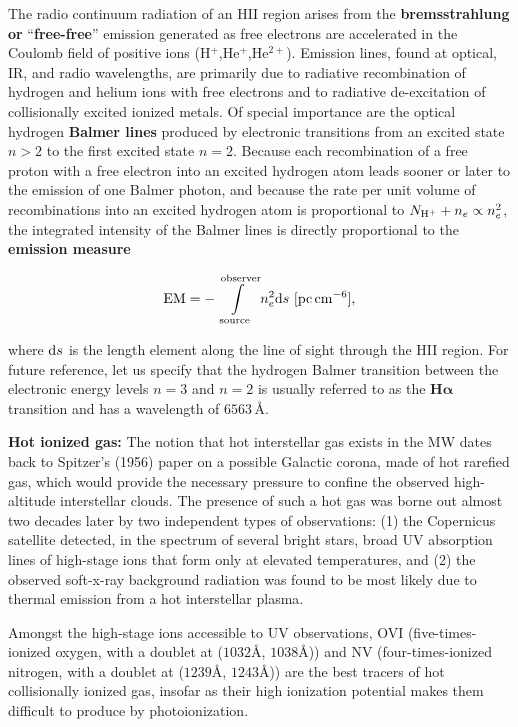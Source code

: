 \documentclass[a4paper,10pt]{article}
\begin{document}
{\noindent}The radio continuum radiation of an HII region arises
from the \textbf{bremsstrahlung or} ``\textbf{free-free}'' emission generated as free electrons are accelerated in the Coulomb field of positive ions (H$^+$,He$^+$,He$^{2+}$). Emission lines, found at optical, IR, and radio wavelengths, are primarily due to radiative recombination of hydrogen and helium ions with free electrons and to radiative de-excitation of collisionally excited ionized metals. Of special importance are the optical hydrogen \textbf{Balmer lines} produced by electronic transitions from an excited state $n>2$ to the first excited state $n=2$. Because each recombination of a free proton with a free electron into an excited hydrogen atom leads sooner or later to the emission of one Balmer photon, and because the rate per unit volume of recombinations into an excited hydrogen atom is proportional to $N_{\rm H^+} + n_e \propto n_e^2$, the integrated intensity of the Balmer lines is directly proportional to the \textbf{emission measure}

\begin{align*}
    {\rm EM} = -\int\limits_{\rm source}^{\rm observer}n_e^2{\rm d}s ~ [{\rm pc\,cm^{-6}}],
\end{align*}

{\noindent}where ${\rm d}s$ is the length element along the line of sight through the HII region. For future reference, let us specify that the hydrogen Balmer transition between the electronic energy levels $n=3$ and $n=2$ is usually referred to as the $\mathbf{H\alpha}$ transition and has a wavelength of $6563$\,\AA.

{\noindent}\textbf{Hot ionized gas:} The notion that hot interstellar gas exists in the MW dates back to Spitzer's (1956) paper on a possible Galactic corona, made of hot rarefied gas, which would provide the necessary pressure to confine the observed high-altitude interstellar clouds. The presence of such a hot gas was borne out almost two decades later by two independent types of observations: (1) the Copernicus satellite detected, in the spectrum of several bright stars, broad UV absorption lines of high-stage ions that form only at elevated temperatures, and (2) the observed soft-x-ray background radiation was found to be most likely due to thermal emission from a hot interstellar plasma.

{\noindent}Amongst the high-stage ions accessible to UV observations, OVI (five-times-ionized oxygen, with a doublet at ($1032$\AA, $1038$\AA)) and NV (four-times-ionized nitrogen, with a doublet at ($1239$\AA, $1243$\AA)) are the best tracers of hot collisionally ionized gas, insofar as their high ionization potential makes them difficult to produce by photoionization.
\end{document}
